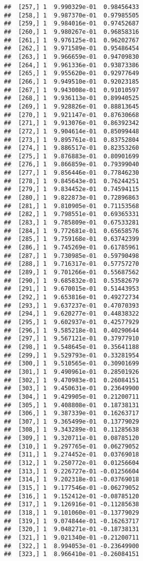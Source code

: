 \documentclass[
  12pt,
]{article}
\begin{document}
\begin{verbatim}
##  [257,] 1  9.990329e-01  0.98456433
##  [258,] 1  9.987370e-01  0.97985505
##  [259,] 1  9.984016e-01  0.97452687
##  [260,] 1  9.980267e-01  0.96858316
##  [261,] 1  9.976125e-01  0.96202767
##  [262,] 1  9.971589e-01  0.95486454
##  [263,] 1  9.966659e-01  0.94709830
##  [264,] 1  9.961336e-01  0.93873386
##  [265,] 1  9.955620e-01  0.92977649
##  [266,] 1  9.949510e-01  0.92023185
##  [267,] 1  9.943008e-01  0.91010597
##  [268,] 1  9.936113e-01  0.89940525
##  [269,] 1  9.928826e-01  0.88813645
##  [270,] 1  9.921147e-01  0.87630668
##  [271,] 1  9.913076e-01  0.86392342
##  [272,] 1  9.904614e-01  0.85099448
##  [273,] 1  9.895761e-01  0.83752804
##  [274,] 1  9.886517e-01  0.82353260
##  [275,] 1  9.876883e-01  0.80901699
##  [276,] 1  9.866859e-01  0.79399040
##  [277,] 1  9.856446e-01  0.77846230
##  [278,] 1  9.845643e-01  0.76244251
##  [279,] 1  9.834452e-01  0.74594115
##  [280,] 1  9.822873e-01  0.72896863
##  [281,] 1  9.810905e-01  0.71153568
##  [282,] 1  9.798551e-01  0.69365331
##  [283,] 1  9.785809e-01  0.67533281
##  [284,] 1  9.772681e-01  0.65658576
##  [285,] 1  9.759168e-01  0.63742399
##  [286,] 1  9.745269e-01  0.61785961
##  [287,] 1  9.730985e-01  0.59790498
##  [288,] 1  9.716317e-01  0.57757270
##  [289,] 1  9.701266e-01  0.55687562
##  [290,] 1  9.685832e-01  0.53582679
##  [291,] 1  9.670015e-01  0.51443953
##  [292,] 1  9.653816e-01  0.49272734
##  [293,] 1  9.637237e-01  0.47070393
##  [294,] 1  9.620277e-01  0.44838322
##  [295,] 1  9.602937e-01  0.42577929
##  [296,] 1  9.585218e-01  0.40290644
##  [297,] 1  9.567121e-01  0.37977910
##  [298,] 1  9.548645e-01  0.35641188
##  [299,] 1  9.529793e-01  0.33281954
##  [300,] 1  9.510565e-01  0.30901699
##  [301,] 1  9.490961e-01  0.28501926
##  [302,] 1  9.470983e-01  0.26084151
##  [303,] 1  9.450631e-01  0.23649900
##  [304,] 1  9.429905e-01  0.21200711
##  [305,] 1  9.408808e-01  0.18738131
##  [306,] 1  9.387339e-01  0.16263717
##  [307,] 1  9.365499e-01  0.13779029
##  [308,] 1  9.343289e-01  0.11285638
##  [309,] 1  9.320711e-01  0.08785120
##  [310,] 1  9.297765e-01  0.06279052
##  [311,] 1  9.274452e-01  0.03769018
##  [312,] 1  9.250772e-01  0.01256604
##  [313,] 1  9.226727e-01 -0.01256604
##  [314,] 1  9.202318e-01 -0.03769018
##  [315,] 1  9.177546e-01 -0.06279052
##  [316,] 1  9.152412e-01 -0.08785120
##  [317,] 1  9.126916e-01 -0.11285638
##  [318,] 1  9.101060e-01 -0.13779029
##  [319,] 1  9.074844e-01 -0.16263717
##  [320,] 1  9.048271e-01 -0.18738131
##  [321,] 1  9.021340e-01 -0.21200711
##  [322,] 1  8.994053e-01 -0.23649900
##  [323,] 1  8.966410e-01 -0.26084151

\end{verbatim}
\end{document}
